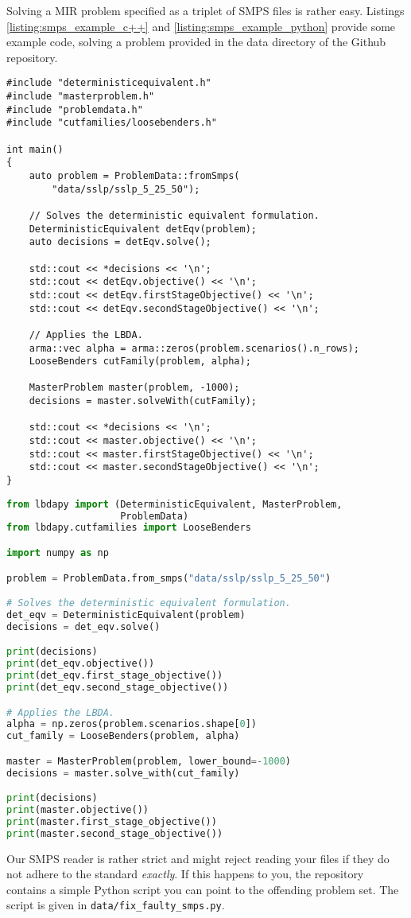 \documentclass[12pt, english]{article}
\begin{document}
Solving a MIR problem specified as a triplet of SMPS files is rather easy. Listings \ref{listing:smps_example_c++} and \ref{listing:smps_example_python} provide some example code, solving a problem provided in the data directory of the Github repository.
\begin{lstlisting}[caption={Solving an SMPS problem in C++.},
                   label={listing:smps_example_c++}]
#include "deterministicequivalent.h"
#include "masterproblem.h"
#include "problemdata.h"
#include "cutfamilies/loosebenders.h"

int main()
{
	auto problem = ProblemData::fromSmps(
		"data/sslp/sslp_5_25_50");
	
	// Solves the deterministic equivalent formulation.
	DeterministicEquivalent detEqv(problem);
	auto decisions = detEqv.solve();
	
	std::cout << *decisions << '\n';
	std::cout << detEqv.objective() << '\n';
	std::cout << detEqv.firstStageObjective() << '\n';
	std::cout << detEqv.secondStageObjective() << '\n';
	
	// Applies the LBDA.
	arma::vec alpha = arma::zeros(problem.scenarios().n_rows);
	LooseBenders cutFamily(problem, alpha);
	
	MasterProblem master(problem, -1000);
	decisions = master.solveWith(cutFamily);
	
	std::cout << *decisions << '\n';
	std::cout << master.objective() << '\n';
	std::cout << master.firstStageObjective() << '\n';
	std::cout << master.secondStageObjective() << '\n';
}
\end{lstlisting}
\begin{lstlisting}[caption={Solving an SMPS problem in Python.},
                   label={listing:smps_example_python},
                   language={Python}]
from lbdapy import (DeterministicEquivalent, MasterProblem, 
                    ProblemData)
from lbdapy.cutfamilies import LooseBenders

import numpy as np

problem = ProblemData.from_smps("data/sslp/sslp_5_25_50")

# Solves the deterministic equivalent formulation.
det_eqv = DeterministicEquivalent(problem)
decisions = det_eqv.solve()

print(decisions)
print(det_eqv.objective())
print(det_eqv.first_stage_objective())
print(det_eqv.second_stage_objective())

# Applies the LBDA.
alpha = np.zeros(problem.scenarios.shape[0])
cut_family = LooseBenders(problem, alpha)

master = MasterProblem(problem, lower_bound=-1000)
decisions = master.solve_with(cut_family)

print(decisions)
print(master.objective())
print(master.first_stage_objective())
print(master.second_stage_objective())
\end{lstlisting}
Our SMPS reader is rather strict and might reject reading your files if they do not adhere to the standard \textit{exactly}. If this happens to you, the repository contains a simple Python script you can point to the offending problem set. The script is given in \texttt{data/fix\_faulty\_smps.py}.
\end{document}
